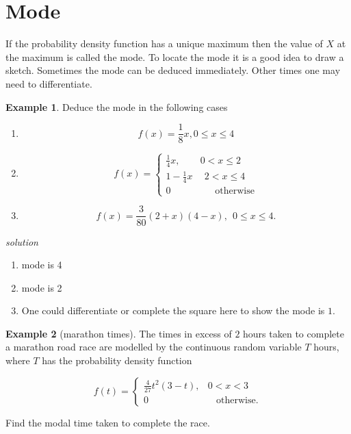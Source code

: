 \documentclass[
]{book}
\theoremstyle{definition}
\theoremstyle{definition}
\newtheorem{example}{Example}[chapter]
\theoremstyle{definition}
\theoremstyle{definition}
\theoremstyle{remark}
\begin{document}
\hypertarget{mode}{%
\section{Mode}\label{mode}}

If the probability density function has a unique maximum then the value of \(X\) at the maximum is called the mode. To locate the mode it is a good idea to draw a sketch. Sometimes the mode can be deduced immediately. Other times one may need to differentiate.

\begin{example}

Deduce the mode in the following cases

\begin{enumerate}
\def\labelenumi{\alph{enumi})}
\item
  \[f(x) = \frac{1}{8}x , 0\leq x \leq 4\]
\item
  \begin{equation*}
    f(x)=\begin{cases}
   \frac{1}{4}x, &  0< x \leq 2 \\
   1-\frac{1}{4}x & \ \  2< x \leq 4 \\
   0& \ \ \ \ \  \ \ \text{otherwise}
    \end{cases}
  \end{equation*}
\item
  \[f(x) = \frac{3}{80}(2+x)(4-x) , \ \  0\leq x \leq 4.\]
\end{enumerate}

\emph{solution}

\begin{enumerate}
\def\labelenumi{\alph{enumi})}
\item
  mode is 4
\item
  mode is 2
\item
  One could differentiate or complete the square here to show the mode is \(1\).
\end{enumerate}

\end{example}

\begin{example}[marathon times]
The times in excess of \(2\) hours taken to complete a marathon road race are modelled by the continuous random variable \(T\) hours, where \(T\) has the probability density function

\begin{equation*}
  f(t)=\begin{cases}
    \frac{4}{27}t^2(3-t), &  0< x < 3\\
    0 & \ \ \ \  \text{otherwise}.
  \end{cases}
\end{equation*}

Find the modal time taken to complete the race.
\end{example}
\end{document}
